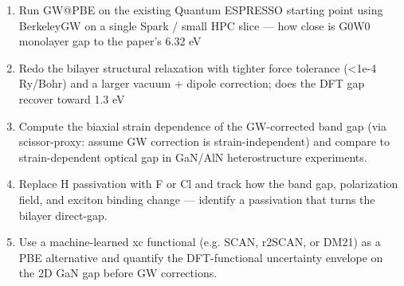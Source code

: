 \documentclass[11pt]{article}
\begin{document}
\begin{enumerate}[leftmargin=1.6em,itemsep=0.2em,topsep=0.2em,label=Q\arabic*.]
\item Run GW@PBE on the existing Quantum ESPRESSO starting point using BerkeleyGW on a single Spark / small HPC slice --- how close is G0W0 monolayer gap to the paper's 6.32 eV
\item Redo the bilayer structural relaxation with tighter force tolerance (\textless{}1e-4 Ry/Bohr) and a larger vacuum + dipole correction; does the DFT gap recover toward 1.3 eV
\item Compute the biaxial strain dependence of the GW-corrected band gap (via scissor-proxy: assume GW correction is strain-independent) and compare to strain-dependent optical gap in GaN/AlN heterostructure experiments.
\item Replace H passivation with F or Cl and track how the band gap, polarization field, and exciton binding change --- identify a passivation that turns the bilayer direct-gap.
\item Use a machine-learned xc functional (e.g. SCAN, r2SCAN, or DM21) as a PBE alternative and quantify the DFT-functional uncertainty envelope on the 2D GaN gap before GW corrections.
\end{enumerate}
\end{document}
